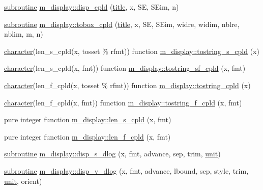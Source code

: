 \begin{DoxyCompactItemize}
\item 
\hyperlink{M__stopwatch_83_8txt_acfbcff50169d691ff02d4a123ed70482}{subroutine} \hyperlink{namespacem__display_a331e5caf7f78cff8f7e19145001bcdca}{m\+\_\+display\+::disp\+\_\+cpld} (\hyperlink{print__watch_83_8txt_a15b5bd21156bb9fca6a755ab8c029a9c}{title}, x, SE, S\+Eim, n)
\item 
\hyperlink{M__stopwatch_83_8txt_acfbcff50169d691ff02d4a123ed70482}{subroutine} \hyperlink{namespacem__display_ac4ed462092efa64e5ce8454e7a752d10}{m\+\_\+display\+::tobox\+\_\+cpld} (\hyperlink{print__watch_83_8txt_a15b5bd21156bb9fca6a755ab8c029a9c}{title}, x, SE, S\+Eim, widre, widim, nblre, nblim, m, n)
\item 
\hyperlink{option__stopwatch_83_8txt_abd4b21fbbd175834027b5224bfe97e66}{character}(len\+\_\+s\+\_\+cpld(x, tosset \% rfmt)) function \hyperlink{namespacem__display_ac2a60653468bfb9215fb85b4518363e9}{m\+\_\+display\+::tostring\+\_\+s\+\_\+cpld} (x)
\item 
\hyperlink{option__stopwatch_83_8txt_abd4b21fbbd175834027b5224bfe97e66}{character}(len\+\_\+s\+\_\+cpld(x, fmt)) function \hyperlink{namespacem__display_a9f3f8dad4340213fd6587a5657b366e0}{m\+\_\+display\+::tostring\+\_\+sf\+\_\+cpld} (x, fmt)
\item 
\hyperlink{option__stopwatch_83_8txt_abd4b21fbbd175834027b5224bfe97e66}{character}(len\+\_\+f\+\_\+cpld(x, tosset \% rfmt)) function \hyperlink{namespacem__display_a12b973ec5880a8f0d789fbdf433d177f}{m\+\_\+display\+::tostring\+\_\+cpld} (x)
\item 
\hyperlink{option__stopwatch_83_8txt_abd4b21fbbd175834027b5224bfe97e66}{character}(len\+\_\+f\+\_\+cpld(x, fmt)) function \hyperlink{namespacem__display_a7bab74c992649c74c27fe924c235e448}{m\+\_\+display\+::tostring\+\_\+f\+\_\+cpld} (x, fmt)
\item 
pure integer function \hyperlink{namespacem__display_ace35690c2f36e28f07336cc7dcff47f4}{m\+\_\+display\+::len\+\_\+s\+\_\+cpld} (x, fmt)
\item 
pure integer function \hyperlink{namespacem__display_a803611d2a793f2a4aa7563b6c8295cb3}{m\+\_\+display\+::len\+\_\+f\+\_\+cpld} (x, fmt)
\item 
\hyperlink{M__stopwatch_83_8txt_acfbcff50169d691ff02d4a123ed70482}{subroutine} \hyperlink{namespacem__display_a610ad67c4cfcad91bb6281b2c7ac3e07}{m\+\_\+display\+::disp\+\_\+s\+\_\+dlog} (x, fmt, advance, sep, trim, \hyperlink{M__stopwatch_83_8txt_a5cbef30eb7c0d734bd82f5a7ebea9aa7}{unit})
\item 
\hyperlink{M__stopwatch_83_8txt_acfbcff50169d691ff02d4a123ed70482}{subroutine} \hyperlink{namespacem__display_ae5c96bc7b0b54e6e183431c31fa7ae80}{m\+\_\+display\+::disp\+\_\+v\+\_\+dlog} (x, fmt, advance, lbound, sep, style, trim, \hyperlink{M__stopwatch_83_8txt_a5cbef30eb7c0d734bd82f5a7ebea9aa7}{unit}, orient)

\end{DoxyCompactItemize}
